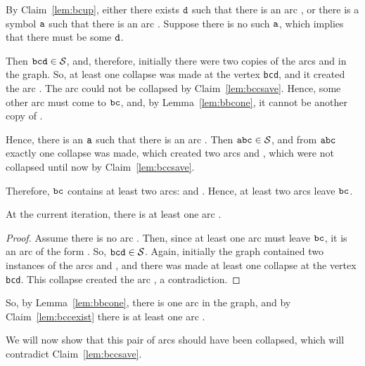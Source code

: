 By Claim~\ref{lem:bcup}, either there exists $ {\tt d} $ such that there is an arc , or there is a symbol $ {\tt a} $ such that there is an arc . Suppose there is no such $ {\tt a} $, which implies that there must be some $ {\tt d} $.

Then $ {\tt bcd} \in {\cal S} $, and, therefore, initially there were two copies of the arcs  and  in the graph. So, at least one collapse was made at the vertex {\tt bcd}, and it created the arc . The arc  could not be collapsed by Claim~\ref{lem:bccsave}. Hence, some other arc must come to $ {\tt bc} $, and, by Lemma~\ref{lem:bbcone}, it cannot be another copy of .

Hence, there is an $ {\tt a} $ such that there is an arc . Then $ {\tt abc} \in {\cal S} $, and from $ {\tt abc} $ exactly one collapse was made, which created two arcs  and , which were not collapsed until now by Claim~\ref{lem:bccsave}.

Therefore, $ {\tt bc} $ contains at least two arcs:  and . Hence, at least two arcs leave $ {\tt bc} $.

\begin{claim}
\label{lem:bccexist}
At the current iteration, there is at least one arc .
\end{claim}
\begin{proof}
Assume there is no arc . Then, since at least one arc must leave $ {\tt bc} $, it is an arc of the form . So, $ {\tt bcd} \in {\cal S} $. Again, initially the graph contained two instances of the arcs  and , and there was made at least one collapse at the vertex {\tt bcd}. This collapse created the arc , a contradiction.
\end{proof}

So, by Lemma~\ref{lem:bbcone}, there is one arc  in the graph, and by Claim~\ref{lem:bccexist} there is at least one arc .

We will now show that this pair of arcs should have been collapsed, which will contradict Claim~\ref{lem:bccsave}.

